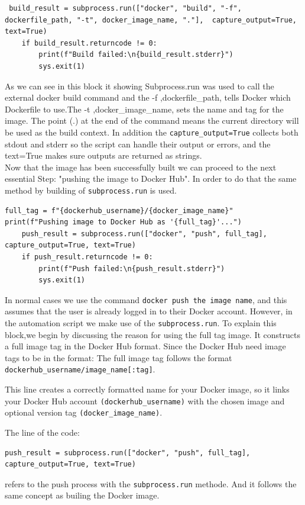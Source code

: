 \begin{lstlisting}
 build_result = subprocess.run(["docker", "build", "-f", dockerfile_path, "-t", docker_image_name, "."],  capture_output=True, text=True)
    if build_result.returncode != 0:
        print(f"Build failed:\n{build_result.stderr}")
        sys.exit(1)
\end{lstlisting}

As we can see in this block it showing Subprocess.run was used  to call the external docker build command and the -f ,dockerfile\_path, tells Docker which Dockerfile to use.The  -t ,docker\_image\_name, sets the name and tag for the image. The point (.) at the end of the command means the current directory will be used as the build context. In addition the \texttt{capture\_output=True} collects both stdout and stderr so the script can handle their output or errors, and the text=True makes sure outputs are returned as strings.
\\Now that the image has been successfully built we can proceed to the next essential Step: "pushing the image to Docker Hub". In order to do that the same method by building of \texttt{subprocess.run} is used.


\begin{lstlisting}
full_tag = f"{dockerhub_username}/{docker_image_name}"
print(f"Pushing image to Docker Hub as '{full_tag}'...")
    push_result = subprocess.run(["docker", "push", full_tag], capture_output=True, text=True)
    if push_result.returncode != 0:
        print(f"Push failed:\n{push_result.stderr}")
        sys.exit(1)

\end{lstlisting}

In normal cases we use the command \texttt{docker push the image name}, and this assumes that the user is already logged in to their Docker account. However, in the automation script we make use of the \texttt{subprocess.run}. 
To explain this block,we begin by discussing the reason for using the full tag image. It constructs a full image tag in the Docker Hub format. Since the Docker Hub need image tags  to be in the format: The full image tag follows the format \texttt{dockerhub\_username/image\_name[:tag]}.

This line creates a correctly formatted name for your Docker image, so it links your Docker Hub account \texttt{(dockerhub\_username)} with the chosen image and optional version tag \texttt{(docker\_image\_name)}.

The line of the code: 
\begin{lstlisting}
push_result = subprocess.run(["docker", "push", full_tag], capture_output=True, text=True)
\end{lstlisting}
refers to the push process with the \texttt{subprocess.run} methode. And it follows the same concept as builing the Docker image. 

